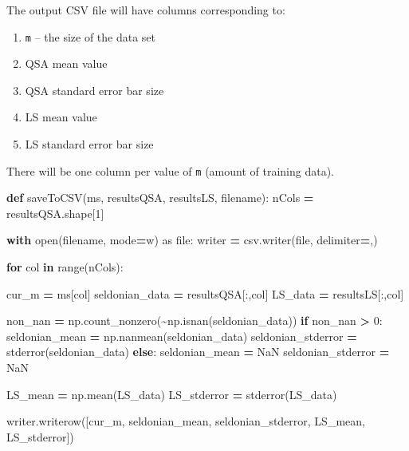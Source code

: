 \documentclass[12pt, twoside]{amherstthesis}
\newenvironment{Shaded}{\begin{snugshade}}{\end{snugshade}}
\newcommand{\BuiltInTok}[1]{#1}
\newcommand{\ControlFlowTok}[1]{\textcolor[rgb]{0.13,0.29,0.53}{\textbf{#1}}}
\newcommand{\DecValTok}[1]{\textcolor[rgb]{0.00,0.00,0.81}{#1}}
\newcommand{\ImportTok}[1]{#1}
\newcommand{\KeywordTok}[1]{\textcolor[rgb]{0.13,0.29,0.53}{\textbf{#1}}}
\newcommand{\NormalTok}[1]{#1}
\newcommand{\OperatorTok}[1]{\textcolor[rgb]{0.81,0.36,0.00}{\textbf{#1}}}
\newcommand{\StringTok}[1]{\textcolor[rgb]{0.31,0.60,0.02}{#1}}
\providecommand{\tightlist}{%
  \setlength{\itemsep}{0pt}\setlength{\parskip}{0pt}}
\begin{document}
\noindent The output CSV file will have columns corresponding to:
\begin{enumerate}
\def\labelenumi{\arabic{enumi}.}
\tightlist
\item
  \texttt{m} -- the size of the data set
\item
  QSA mean value
\item
  QSA standard error bar size
\item
  LS mean value
\item
  LS standard error bar size
\end{enumerate}
\noindent There will be one column per value of \texttt{m} (amount of training data).
\begin{Shaded}
\begin{Highlighting}[]
\KeywordTok{def}\NormalTok{ saveToCSV(ms, resultsQSA, resultsLS, filename):}
\NormalTok{    nCols }\OperatorTok{=}\NormalTok{ resultsQSA.shape[}\DecValTok{1}\NormalTok{]}

    \ControlFlowTok{with} \BuiltInTok{open}\NormalTok{(filename, mode}\OperatorTok{=}\StringTok{\textquotesingle{}w\textquotesingle{}}\NormalTok{) }\ImportTok{as} \BuiltInTok{file}\NormalTok{:}
\NormalTok{        writer }\OperatorTok{=}\NormalTok{ csv.writer(}\BuiltInTok{file}\NormalTok{, delimiter}\OperatorTok{=}\StringTok{\textquotesingle{},\textquotesingle{}}\NormalTok{)}

        \ControlFlowTok{for}\NormalTok{ col }\KeywordTok{in} \BuiltInTok{range}\NormalTok{(nCols):}

\NormalTok{            cur\_m          }\OperatorTok{=}\NormalTok{ ms[col]}
\NormalTok{            seldonian\_data }\OperatorTok{=}\NormalTok{ resultsQSA[:,col]}
\NormalTok{            LS\_data        }\OperatorTok{=}\NormalTok{ resultsLS[:,col]}

\NormalTok{            non\_nan }\OperatorTok{=}\NormalTok{ np.count\_nonzero(}\OperatorTok{\textasciitilde{}}\NormalTok{np.isnan(seldonian\_data))}
            \ControlFlowTok{if}\NormalTok{ non\_nan }\OperatorTok{\textgreater{}} \DecValTok{0}\NormalTok{:}
\NormalTok{                seldonian\_mean     }\OperatorTok{=}\NormalTok{ np.nanmean(seldonian\_data)}
\NormalTok{                seldonian\_stderror }\OperatorTok{=}\NormalTok{ stderror(seldonian\_data)}
            \ControlFlowTok{else}\NormalTok{:}
\NormalTok{                seldonian\_mean     }\OperatorTok{=} \StringTok{\textquotesingle{}NaN\textquotesingle{}}
\NormalTok{                seldonian\_stderror }\OperatorTok{=} \StringTok{\textquotesingle{}NaN\textquotesingle{}}

\NormalTok{            LS\_mean     }\OperatorTok{=}\NormalTok{ np.mean(LS\_data)}
\NormalTok{            LS\_stderror }\OperatorTok{=}\NormalTok{ stderror(LS\_data)}

\NormalTok{            writer.writerow([cur\_m, seldonian\_mean, seldonian\_stderror, }
\NormalTok{            LS\_mean, LS\_stderror])}
\end{Highlighting}
\end{Shaded}
\end{document}
